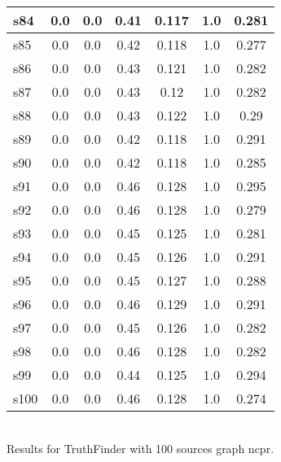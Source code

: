 \documentclass{article}
\begin{document}
\begin{tabular}{|l|c|c|c|c|c|c|}
s84 &0.0 & 0.0 & 0.41 & 0.117 & 1.0 & 0.281\\
\hline
s85 &0.0 & 0.0 & 0.42 & 0.118 & 1.0 & 0.277\\
\hline
s86 &0.0 & 0.0 & 0.43 & 0.121 & 1.0 & 0.282\\
\hline
s87 &0.0 & 0.0 & 0.43 & 0.12 & 1.0 & 0.282\\
\hline
s88 &0.0 & 0.0 & 0.43 & 0.122 & 1.0 & 0.29\\
\hline
s89 &0.0 & 0.0 & 0.42 & 0.118 & 1.0 & 0.291\\
\hline
s90 &0.0 & 0.0 & 0.42 & 0.118 & 1.0 & 0.285\\
\hline
s91 &0.0 & 0.0 & 0.46 & 0.128 & 1.0 & 0.295\\
\hline
s92 &0.0 & 0.0 & 0.46 & 0.128 & 1.0 & 0.279\\
\hline
s93 &0.0 & 0.0 & 0.45 & 0.125 & 1.0 & 0.281\\
\hline
s94 &0.0 & 0.0 & 0.45 & 0.126 & 1.0 & 0.291\\
\hline
s95 &0.0 & 0.0 & 0.45 & 0.127 & 1.0 & 0.288\\
\hline
s96 &0.0 & 0.0 & 0.46 & 0.129 & 1.0 & 0.291\\
\hline
s97 &0.0 & 0.0 & 0.45 & 0.126 & 1.0 & 0.282\\
\hline
s98 &0.0 & 0.0 & 0.46 & 0.128 & 1.0 & 0.282\\
\hline
s99 &0.0 & 0.0 & 0.44 & 0.125 & 1.0 & 0.294\\
\hline
s100 &0.0 & 0.0 & 0.46 & 0.128 & 1.0 & 0.274\\
\hline
\end{tabular}\\

\noindent Results for TruthFinder with 100 sources graph ncpr.
\end{document}
